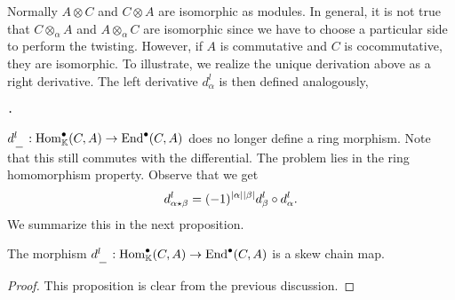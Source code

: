 \documentclass[../thesis.tex]{subfiles}
\begin{document}
            Normally $A\otimes C$ and $C\otimes A$ are isomorphic as modules. In general, it is not true that $C\otimes_\alpha A$ and $A\otimes_\alpha C$ are isomorphic since we have to choose a particular side to perform the twisting. However, if $A$ is commutative and $C$ is cocommutative, they are isomorphic. To illustrate, we realize the unique derivation above as a right derivative. The left derivative $d_\alpha^l$ is then defined analogously,
            \begin{center}
                \tt{.}
            \end{center}

            $d_{\argument}^l : \tt{Hom}_\mathbb{K}^\bullet(C,A) \rightarrow \tt{End}^\bullet(C,A)$ does no longer define a ring morphism. Note that this still commutes with the differential. The problem lies in the ring homomorphism property. Observe that we get
            \begin{align*}
                d_{\alpha\star\beta}^l = (-1)^{|\alpha||\beta|}d_\beta^l\circ d_\alpha^l\tt{.}
            \end{align*}
            We summarize this in the next proposition.

            \begin{proposition}
                The morphism $d_{\argument}^l : \tt{Hom}_\mathbb{K}^\bullet(C,A) \rightarrow \tt{End}^\bullet(C,A)$ is a skew chain map. 
            \end{proposition}

            \begin{proof}
                This proposition is clear from the previous discussion.
            \end{proof}
            
\end{document}
